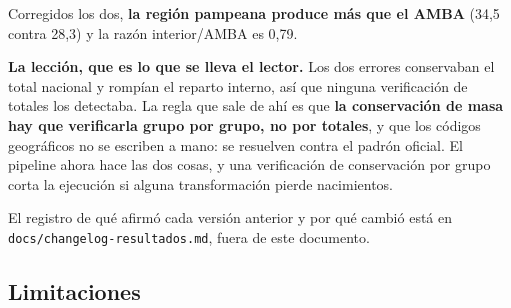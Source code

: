 \documentclass[11pt,a4paper]{article}
\begin{document}
Corregidos los dos, \textbf{la región pampeana produce más que el AMBA} (34,5
contra 28,3) y la razón interior/AMBA es 0,79.

\textbf{La lección, que es lo que se lleva el lector.} Los dos errores conservaban
el total nacional y rompían el reparto interno, así que ninguna verificación de
totales los detectaba. La regla que sale de ahí es que \textbf{la conservación de masa
hay que verificarla grupo por grupo, no por totales}, y que los códigos
geográficos no se escriben a mano: se resuelven contra el padrón oficial. El
pipeline ahora hace las dos cosas, y una verificación de conservación por grupo
corta la ejecución si alguna transformación pierde nacimientos.

El registro de qué afirmó cada versión anterior y por qué cambió está en
\texttt{docs/changelog-resultados.md}, fuera de este documento.

\subsection{Limitaciones}
\label{sec:limitaciones}
\end{document}
